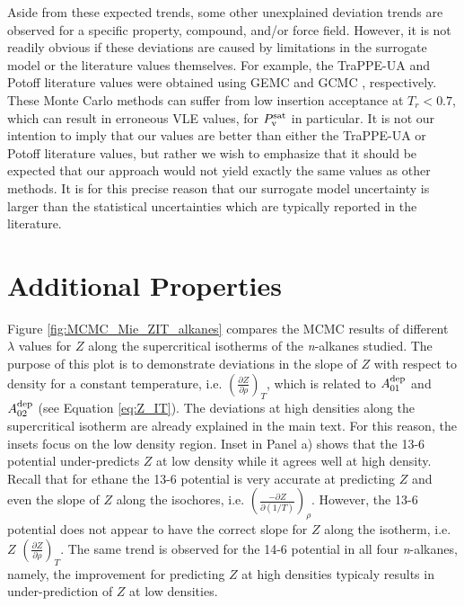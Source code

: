 \documentclass[journal=jctc,manuscript=article]{achemso}
\begin{document}
Aside from these expected trends, some other unexplained deviation trends are observed for a specific property, compound, and/or force field. However, it is not readily obvious if these deviations are caused by limitations in the surrogate model or the literature values themselves. For example, the TraPPE-UA and Potoff literature values were obtained using GEMC \cite{TraPPE,Validation} and GCMC \cite{Mie}, respectively. These Monte Carlo methods can suffer from low insertion acceptance at $T_r<0.7$, which can result in erroneous VLE values, for $P_{\rm v}^{\rm sat}$ in particular. It is not our intention to imply that our values are better than either the TraPPE-UA or Potoff literature values, but rather we wish to emphasize that it should be expected that our approach would not yield exactly the same values as other methods. It is for this precise reason that our surrogate model uncertainty is larger than the statistical uncertainties which are typically reported in the literature.  

\newpage

\section{Additional Properties} \label{Udep and Z_IT}

Figure \ref{fig:MCMC_Mie_ZIT_alkanes} compares the MCMC results of different $\lambda$ values for $Z$ along the supercritical isotherms of the \textit{n}-alkanes studied. The purpose of this plot is to demonstrate deviations in the slope of $Z$ with respect to density for a constant temperature, i.e. $\left(\frac{\partial Z}{\partial \rho}\right)_T$, which is related to $A_{01}^{\rm dep}$ and $A_{02}^{\rm dep}$ (see Equation \ref{eq:Z_IT}). The deviations at high densities along the supercritical isotherm are already explained in the main text. For this reason, the insets focus on the low density region. Inset in Panel a) shows that the 13-6 potential under-predicts $Z$ at low density while it agrees well at high density. Recall that for ethane the 13-6 potential is very accurate at predicting $Z$ and even the slope of $Z$ along the isochores, i.e. $\left(\frac{-\partial Z}{\partial(1/T)}\right)_\rho$. However, the 13-6 potential does not appear to have the correct slope for $Z$ along the isotherm, i.e. $Z$ $\left(\frac{\partial Z}{\partial \rho}\right)_T$. The same trend is observed for the 14-6 potential in all four \textit{n}-alkanes, namely, the improvement for predicting $Z$ at high densities typicaly results in under-prediction of $Z$ at low densities.
\end{document}
